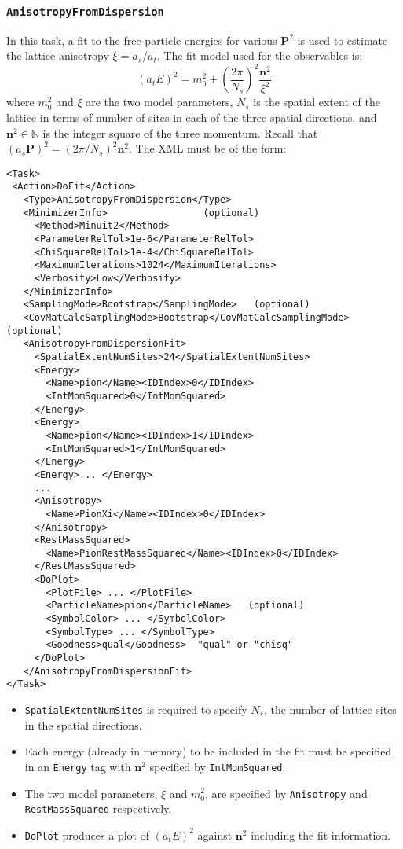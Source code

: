 \documentclass[12pt]{article}
\newcommand{\vb}{\texttt}
\begin{document}
\subsubsection{\vb{AnisotropyFromDispersion}}
In this task, a fit to the free-particle energies for various $\mathbf{P}^2$ is used to estimate the lattice
anisotropy $\xi = a_s / a_t$. The fit model used for the observables is:
\[
\left(a_t E\right)^2 = m_0^2 +  \left(\frac{2\pi}{N_s}\right)^2 \frac{\mathbf{n}^2}{\xi^2}
\]
where $m_0^2$ and $\xi$ are the two model parameters, $N_s$ is the spatial extent of the lattice in terms of
number of sites in each of the three spatial directions, and $\mathbf{n}^2 \in \mathbb{N}$ is the integer
square of the three momentum. Recall that
$\left(a_s \mathbf{P}\right)^2 = \left( 2\pi / N_s \right)^2 \mathbf{n}^2$.
The XML must be of the form:
\begin{verbatim}
<Task>
 <Action>DoFit</Action>
   <Type>AnisotropyFromDispersion</Type>
   <MinimizerInfo>                 (optional)
     <Method>Minuit2</Method>
     <ParameterRelTol>1e-6</ParameterRelTol>
     <ChiSquareRelTol>1e-4</ChiSquareRelTol>
     <MaximumIterations>1024</MaximumIterations>
     <Verbosity>Low</Verbosity>
   </MinimizerInfo>
   <SamplingMode>Bootstrap</SamplingMode>   (optional)
   <CovMatCalcSamplingMode>Bootstrap</CovMatCalcSamplingMode> (optional)
   <AnisotropyFromDispersionFit>
     <SpatialExtentNumSites>24</SpatialExtentNumSites>
     <Energy>
       <Name>pion</Name><IDIndex>0</IDIndex>
       <IntMomSquared>0</IntMomSquared>
     </Energy>
     <Energy>
       <Name>pion</Name><IDIndex>1</IDIndex>
       <IntMomSquared>1</IntMomSquared>
     </Energy>
     <Energy>... </Energy>
     ...
     <Anisotropy>
       <Name>PionXi</Name><IDIndex>0</IDIndex>
     </Anisotropy>
     <RestMassSquared>
       <Name>PionRestMassSquared</Name><IDIndex>0</IDIndex>
     </RestMassSquared>
     <DoPlot>
       <PlotFile> ... </PlotFile>
       <ParticleName>pion</ParticleName>   (optional)
       <SymbolColor> ... </SymbolColor>
       <SymbolType> ... </SymbolType>
       <Goodness>qual</Goodness>  "qual" or "chisq"
     </DoPlot>
   </AnisotropyFromDispersionFit>
</Task>
\end{verbatim}

\begin{itemize}
\item \vb{SpatialExtentNumSites} is required to specify $N_s$, the number of lattice sites in the
  spatial directions.
\item Each energy (already in memory) to be included in the fit must be specified in an \vb{Energy}
  tag with $\mathbf{n}^2$  specified by \vb{IntMomSquared}.
\item The two model parameters, $\xi$ and $m_0^2$, are specified by \vb{Anisotropy} and \vb{RestMassSquared}
  respectively.
\item \vb{DoPlot} produces a plot of $\left(a_t E\right)^2$ against $\mathbf{n}^2$ including the fit information.
\end{itemize}
\end{document}
